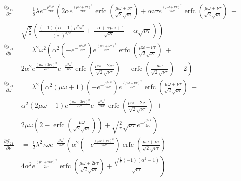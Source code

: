 \documentclass{article}
\DeclareMathOperator{\erfc}{erfc}
\begin{document}
\begin{align}
\\ \nonumber
\frac{\partial {\mathcal J}_{12}}{\partial \tau} \ &= \
\frac{1}{8} \lambda  e^{-\frac{\mu^2 \omega^2}{2 \nu \tau}} \left(2 \alpha  e^{\frac{(\mu \omega+\nu \tau)^2}{2 \nu \tau}} \erfc \left(\frac{\mu \omega+\nu \tau}{\sqrt{2} \sqrt{\nu \tau}}\right)+\alpha  \nu \tau e^{\frac{(\mu \omega+\nu \tau)^2}{2 \nu \tau}} \erfc \left(\frac{\mu \omega+\nu \tau}{\sqrt{2} \sqrt{\nu \tau}}\right)\ + \right. \\ \nonumber &\left. \sqrt{\frac{2}{\pi }} \left(\frac{(-1) (\alpha -1) \mu^2 \omega^2}{(\nu \tau)^{3/2}}+\frac{-\alpha +\alpha  \mu \omega+1}{\sqrt{\nu \tau}}-\alpha  \sqrt{\nu \tau}\right)\right)
\\ \nonumber
\frac{\partial {\mathcal J}_{21}}{\partial \mu} \ &= \
\lambda ^2 \omega^2 \left(\alpha ^2 \left(-e^{-\frac{\mu^2 \omega^2}{2 \nu \tau}}\right) e^{\frac{(\mu \omega+\nu \tau)^2}{2 \nu \tau}} \erfc \left(\frac{\mu \omega+\nu \tau}{\sqrt{2} \sqrt{\nu \tau}}\right)\ + \right. \\ \nonumber &\left. 2 \alpha ^2 e^{\frac{(\mu \omega+2 \nu \tau)^2}{2 \nu \tau}} e^{-\frac{\mu^2 \omega^2}{2 \nu \tau}} \erfc \left(\frac{\mu \omega+2 \nu \tau}{\sqrt{2} \sqrt{\nu \tau}}\right)-\erfc \left(\frac{\mu \omega}{\sqrt{2} \sqrt{\nu \tau}}\right)+2\right)
\\ \nonumber
\frac{\partial {\mathcal J}_{21}}{\partial \omega} \ &= \
\lambda ^2 \left(\alpha ^2 (\mu \omega+1) \left(-e^{-\frac{\mu^2 \omega^2}{2 \nu \tau}}\right) e^{\frac{(\mu \omega+\nu \tau)^2}{2 \nu \tau}} \erfc \left(\frac{\mu \omega+\nu \tau}{\sqrt{2} \sqrt{\nu \tau}}\right)\ + \right. \\ \nonumber &\left. \alpha ^2 (2 \mu \omega+1) e^{\frac{(\mu \omega+2 \nu \tau)^2}{2 \nu \tau}} e^{-\frac{\mu^2 \omega^2}{2 \nu \tau}} \erfc \left(\frac{\mu \omega+2 \nu \tau}{\sqrt{2} \sqrt{\nu \tau}}\right)\ + \right. \\ \nonumber &\left. 2 \mu \omega \left(2-\erfc \left(\frac{\mu \omega}{\sqrt{2} \sqrt{\nu \tau}}\right)\right)+\sqrt{\frac{2}{\pi }} \sqrt{\nu \tau} e^{-\frac{\mu^2 \omega^2}{2 \nu \tau}}\right)
\\ \nonumber
\frac{\partial {\mathcal J}_{21}}{\partial \nu} \ &= \
\frac{1}{2} \lambda ^2 \tau \omega e^{-\frac{\mu^2 \omega^2}{2 \nu \tau}} \left(\alpha ^2 \left(-e^{\frac{(\mu \omega+\nu \tau)^2}{2 \nu \tau}}\right) \erfc \left(\frac{\mu \omega+\nu \tau}{\sqrt{2} \sqrt{\nu \tau}}\right)\ + \right. \\ \nonumber &\left. 4 \alpha ^2 e^{\frac{(\mu \omega+2 \nu \tau)^2}{2 \nu \tau}} \erfc \left(\frac{\mu \omega+2 \nu \tau}{\sqrt{2} \sqrt{\nu \tau}}\right)+\frac{\sqrt{\frac{2}{\pi }} (-1) \left(\alpha ^2-1\right)}{\sqrt{\nu \tau}}\right)

\end{align}
\end{document}
